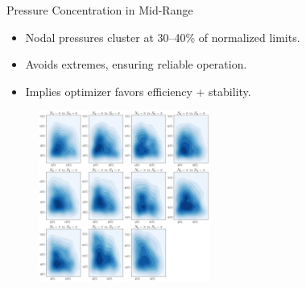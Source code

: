 \documentclass[hyperref={colorlinks,citecolor=blue,linkcolor=blue,urlcolor=blue}]{beamer}
\begin{document}
\begin{frame}{Pressure Concentration in Mid-Range}
\scriptsize
    \begin{itemize}
        \item Nodal pressures cluster at 30--40\% of normalized limits.
        \item Avoids extremes, ensuring reliable operation.
        \item Implies optimizer favors efficiency + stability.
    \end{itemize}
    \begin{figure}
        \includegraphics[width=0.5\textwidth]{figures/outputs_outputs_3.png}
    \end{figure}
\end{frame}
\end{document}
